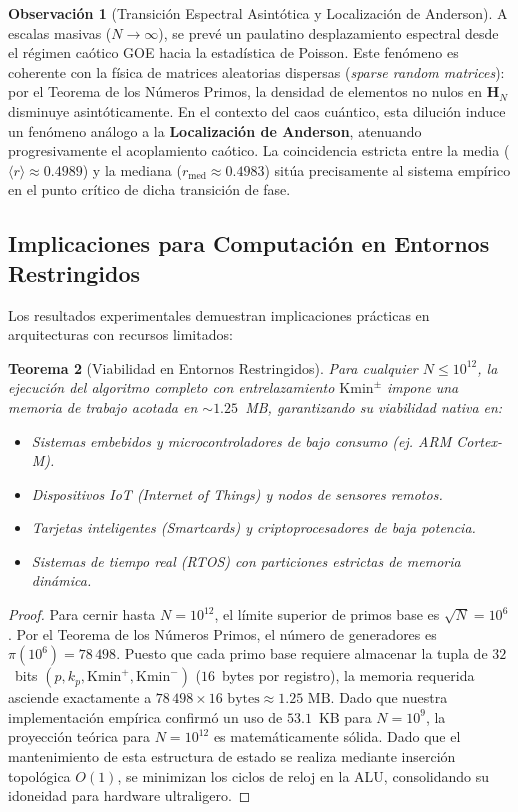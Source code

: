 \documentclass{article}
\numberwithin{equation}{section}
\theoremstyle{plain}
\newtheorem{theorem}{Teorema}[section]
\theoremstyle{definition}
\newtheorem{remark}[theorem]{Observación}
\begin{document}
\begin{remark}[Transición Espectral Asintótica y Localización de Anderson]
\label{rem:transicion-espectral}
A escalas masivas ($N \to \infty$), se prevé un paulatino desplazamiento espectral desde el régimen caótico GOE hacia la estadística de Poisson. Este fenómeno es coherente con la física de matrices aleatorias dispersas (\textit{sparse random matrices}): por el Teorema de los Números Primos, la densidad de elementos no nulos en $\mathbf{H}_N$ disminuye asintóticamente. En el contexto del caos cuántico, esta dilución induce un fenómeno análogo a la \textbf{Localización de Anderson}, atenuando progresivamente el acoplamiento caótico. La coincidencia estricta entre la media ($\langle r \rangle \approx 0.4989$) y la mediana ($r_{\text{med}} \approx 0.4983$) sitúa precisamente al sistema empírico en el punto crítico de dicha transición de fase.
\end{remark}

\subsection{Implicaciones para Computación en Entornos Restringidos}

Los resultados experimentales demuestran implicaciones prácticas en arquitecturas con recursos limitados:

\begin{theorem}[Viabilidad en Entornos Restringidos]
\label{thm:viabilidad-rsr}
Para cualquier $N \le 10^{12}$, la ejecución del algoritmo completo con entrelazamiento $\mathrm{Kmin}^\pm$ impone una memoria de trabajo acotada en $\sim 1.25$~MB, garantizando su viabilidad nativa en:
\begin{itemize}
    \item Sistemas embebidos y microcontroladores de bajo consumo (ej. ARM Cortex-M).
    \item Dispositivos IoT (\textit{Internet of Things}) y nodos de sensores remotos.
    \item Tarjetas inteligentes (\textit{Smartcards}) y criptoprocesadores de baja potencia.
    \item Sistemas de tiempo real (RTOS) con particiones estrictas de memoria dinámica.
\end{itemize}
\end{theorem}

\begin{proof}
Para cernir hasta $N = 10^{12}$, el límite superior de primos base es $\sqrt{N} = 10^6$. Por el Teorema de los Números Primos, el número de generadores es $\pi(10^6) = 78\,498$. Puesto que cada primo base requiere almacenar la tupla de $32$~bits $(p, k_p, \mathrm{Kmin}^+, \mathrm{Kmin}^-)$ ($16$~bytes por registro), la memoria requerida asciende exactamente a $78\,498 \times 16 \text{ bytes} \approx 1.25 \text{ MB}$. Dado que nuestra implementación empírica confirmó un uso de $53.1$~KB para $N=10^9$, la proyección teórica para $N=10^{12}$ es matemáticamente sólida. Dado que el mantenimiento de esta estructura de estado se realiza mediante inserción topológica $O(1)$, se minimizan los ciclos de reloj en la ALU, consolidando su idoneidad para hardware ultraligero.
\end{proof}
\end{document}
